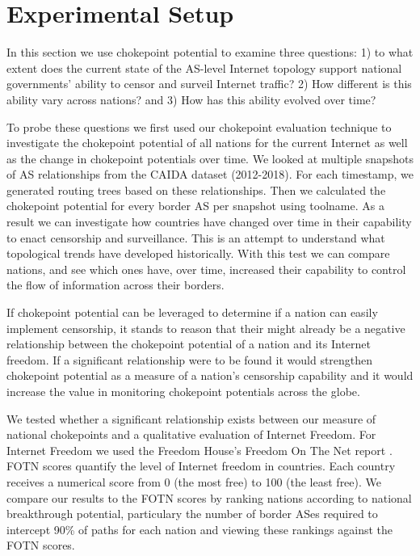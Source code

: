 \section{Experimental Setup}
\label{sec:exp}


In this section we use chokepoint potential to examine three questions: 1) to
what extent does the current state of the AS-level Internet topology support
national governments' ability to censor and surveil Internet traffic? 2) How
different is this ability vary across nations? and 3)  How has this ability
evolved over time?

To probe these questions we first used our chokepoint evaluation technique to
investigate the chokepoint potential of all nations for the current Internet as
well as the change in chokepoint potentials over time. We looked at multiple
snapshots of AS relationships from the CAIDA dataset (2012-2018).  For each
timestamp, we generated routing trees based on these relationships. Then we
calculated the chokepoint potential for every border AS per snapshot using
toolname{}. As a result we can investigate how countries have changed over time
in their capability to enact censorship and surveillance. This is an attempt to
understand what topological trends have developed historically.  With this test
we can compare nations, and see which ones have, over time, increased their
capability to control the flow of information across their borders.

If chokepoint potential can be leveraged to determine if a nation can easily
implement censorship, it stands to reason that their might already be a
negative relationship between the chokepoint potential of a nation and its
Internet freedom. If a significant relationship were to be found it would
strengthen chokepoint potential as a measure of a nation's censorship
capability and it would increase the value in monitoring chokepoint potentials
across the globe.

We tested whether a significant relationship exists between our measure of
national chokepoints and a qualitative evaluation of Internet Freedom. For
Internet Freedom we used the Freedom House's Freedom On The Net report
\cite{FOTN}. FOTN scores quantify the level of Internet freedom in countries.
Each country receives a numerical score from 0 (the most free) to 100 (the
least free). We compare our results to the FOTN scores by ranking nations
according to national breakthrough potential, particulary the number of border
ASes required to intercept 90\% of paths for each nation and viewing these
rankings against the FOTN scores.
